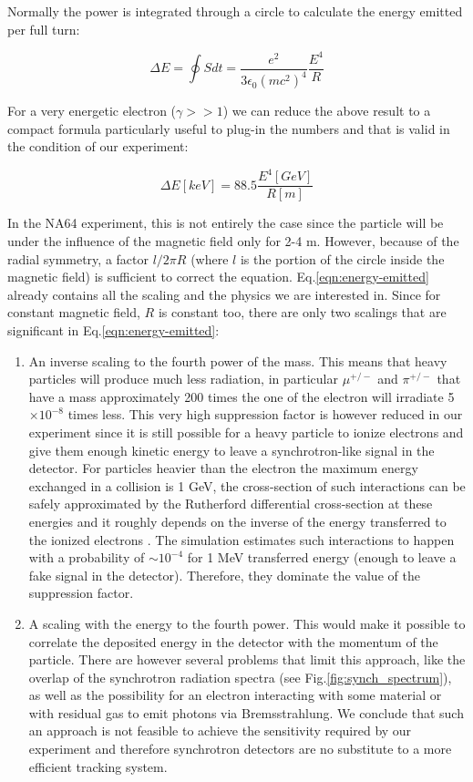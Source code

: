 Normally the power is integrated through a circle to calculate the energy emitted per full turn:

\begin{equation}
\Delta E = \oint S dt = \frac{e^2}{3\epsilon_0(mc^2)^4}\frac{E^4}{R}
\label{eqn:energy-emitted}
\end{equation}

For a very energetic electron ($\gamma >> 1$) we can reduce the above result to a compact formula particularly useful to plug-in the numbers and that is valid in the condition of our experiment:

\begin{equation}
\Delta E[keV] = 88.5\frac{E^4[GeV]}{R[m]}
\label{eqn:energy-emitted-simp}
\end{equation}

In the NA64 experiment, this is not entirely the case since the particle will be under the influence of the magnetic field only for 2-4 \si{\meter}. However, because of the radial symmetry, a factor $l/2\pi R$ (where $l$ is the portion of the circle inside the magnetic field) is sufficient to correct the equation. Eq.\ref{eqn:energy-emitted} already contains all the scaling and the physics we are interested in.
 Since for constant magnetic field, $R$ is constant too, there are only two scalings that are significant in Eq.\ref{eqn:energy-emitted}:
 \begin{enumerate}
 \item An inverse scaling to the fourth power of the mass. This means that heavy particles will produce much less radiation, in particular $\mu^{+/-}$ and $\pi^{+/-}$ that have a mass approximately 200 times the one of the electron will irradiate 5$\times 10^{-8}$ times less. This very high suppression factor is however reduced in our experiment since it is still possible for a heavy particle to ionize electrons and give them enough kinetic energy to leave a synchrotron-like signal in the detector. For particles heavier than the electron the maximum energy exchanged in a collision is 1 GeV, the cross-section of such interactions can be safely approximated by the Rutherford differential cross-section at these energies and it roughly depends on the inverse of the energy transferred to the ionized electrons \cite{review-particle-physics}. The simulation estimates such interactions to happen with a probability of $\sim 10^{-4}$ for 1 MeV transferred energy (enough to leave a fake signal in the detector). Therefore, they dominate the value of the suppression factor.
 \item A scaling with the energy to the fourth power. This would make it possible to correlate the deposited energy in the detector with the momentum of the particle. There are however several problems that limit this approach, like the overlap of the synchrotron radiation spectra (see Fig.\ref{fig:synch_spectrum}), as well as the possibility for an electron interacting with some material or with residual gas to emit photons via Bremsstrahlung. We conclude that such an approach is not feasible to achieve the sensitivity required by our experiment and therefore synchrotron detectors are no substitute to a more efficient tracking system.
 \end{enumerate}
 
